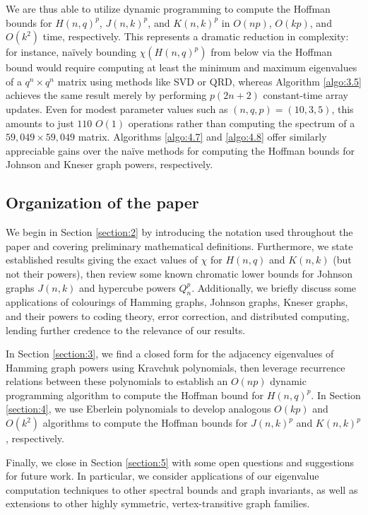 \documentclass{article}
\numberwithin{equation}{section}
\theoremstyle{plain}
\begin{document}
We are thus able to utilize dynamic programming to compute the Hoffman bounds for $H(n, q)^p$, $J(n, k)^p$, and $K(n, k)^p$ in $O(np)$, $O(kp)$, and $O(k^2)$ time, respectively. This represents a dramatic reduction in complexity: for instance, na\"ively bounding $\chi(H(n, q)^p)$ from below via the Hoffman bound would require computing at least the minimum and maximum eigenvalues of a $q^n \times q^n$ matrix using methods like SVD or QRD, whereas Algorithm \ref{algo:3.5} achieves the same result merely by performing $p(2n + 2)$ constant-time array updates. Even for modest parameter values such as $(n, q, p) = (10, 3, 5)$, this amounts to just $110$ $O(1)$ operations rather than computing the spectrum of a $59,\!049 \times 59,\!049$ matrix. Algorithms \ref{algo:4.7} and \ref{algo:4.8} offer similarly appreciable gains over the na\"ive methods for computing the Hoffman bounds for Johnson and Kneser graph powers, respectively.

\subsection{Organization of the paper}\label{subsection:1.1}

We begin in Section \ref{section:2} by introducing the notation used throughout the paper and covering preliminary mathematical definitions. Furthermore, we state established results giving the exact values of $\chi$ for $H(n, q)$ and $K(n, k)$ (but not their powers), then review some known chromatic lower bounds for Johnson graphs $J(n, k)$ and hypercube powers $Q_n^p$. Additionally, we briefly discuss some applications of colourings of Hamming graphs, Johnson graphs, Kneser graphs, and their powers to coding theory, error correction, and distributed computing, lending further credence to the relevance of our results.

In Section \ref{section:3}, we find a closed form for the adjacency eigenvalues of Hamming graph powers using Kravchuk polynomials, then leverage recurrence relations between these polynomials to establish an $O(np)$ dynamic programming algorithm to compute the Hoffman bound for $H(n, q)^p$. In Section \ref{section:4}, we use Eberlein polynomials to develop analogous $O(kp)$ and $O(k^2)$ algorithms to compute the Hoffman bounds for $J(n, k)^p$ and $K(n, k)^p$, respectively.

Finally, we close in Section \ref{section:5} with some open questions and suggestions for future work. In particular, we consider applications of our eigenvalue computation techniques to other spectral bounds and graph invariants, as well as extensions to other highly symmetric, vertex-transitive graph families.
\end{document}
